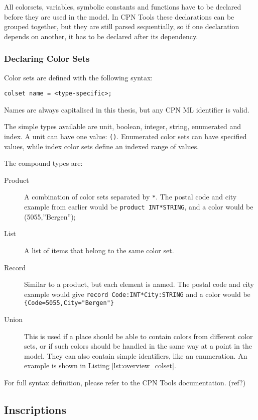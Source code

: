 	All colorsets, variables, symbolic constants and functions have to be declared
	before they are used in the model. In CPN Tools these declarations can be
	grouped together, but they are still parsed sequentially, so if one declaration
	depends on another, it has to be declared after its dependency.
	
	\subsubsection{Declaring Color Sets}
	
		Color sets are defined with the following syntax:
		
		\lstinline:colset name = <type-specific>;:
		
		Names are always capitalised in this thesis, but any CPN ML identifier is
		valid. 
		
		The simple types available are unit, boolean, integer, string, enumerated
		and index. A unit can have one value: \lstinline:():. Enumerated color sets
		can have specified values, while index color sets define an indexed range of
		values. 
		
		The compound types are:
		\begin{description}
		\item[Product] A combination of color sets separated by \lstinline:*:. The
		postal code and city example from earlier would be
		\lstinline:product INT*STRING:, and a color would be (5055,''Bergen'');
		\item[List] A list of items that belong to the same color set.
		\item[Record] Similar to a product, but each element is named. The postal code
		and city example would give \lstinline-record Code:INT*City:STRING- and a
		color would be \lstinline:{Code=5055,City="Bergen"}:
		\item[Union] This is used if a place should be able to contain colors from
		different color sets, or if such colors should be handled in the same way at a
		point in the model. They can also contain simple identifiers, like an
		enumeration. An example is shown in Listing \ref{lst:overview_colset}.
		\end{description}
		
		For full syntax definition, please refer to the CPN Tools
		documentation. (ref?)

\subsection{Inscriptions}

